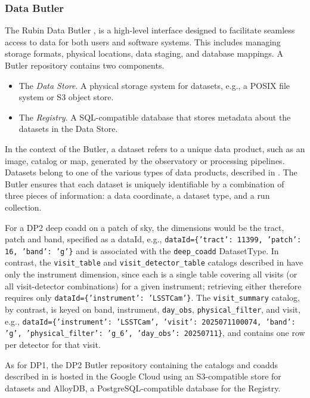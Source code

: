 \subsubsection{Data Butler}
\label{sssec:data_butler}
%
The Rubin Data Butler \citep[][]{2022SPIE12189E..11J, 2023arXiv230303313L},  is a high-level interface designed to facilitate seamless access to data for both users and software systems.
This includes managing storage formats, physical locations, data staging, and database mappings.
A \gls{Butler} repository contains two components.
\begin{itemize}
    \item The \emph{Data Store}.
A physical storage system for datasets, e.g., a \gls{POSIX} file system or \gls{S3} object store.
    \item The \emph{Registry}.
A \gls{SQL}-compatible database that stores \gls{metadata} about the datasets in the Data Store.
\end{itemize}

In the context of the \gls{Butler}, a dataset refers to a unique data product, such as an image, catalog or map, generated by the observatory or processing pipelines.
Datasets belong to one of the various types of data products, described in .
The \gls{Butler} ensures that each dataset is uniquely identifiable by a combination of three pieces of information: a data coordinate, a dataset type, and a run collection.

For a \gls{DP2} deep coadd on a \gls{patch} of sky, the dimensions would be the \gls{tract}, \gls{patch} and band, specified as a dataId, e.g., \texttt{dataId=\{'tract': 11399, 'patch': 16, 'band': 'g'\}} and is associated with the \texttt{deep\_coadd} DatasetType.
In contrast, the \texttt{visit\_table} and \texttt{visit\_detector\_table} catalogs described in  have only the instrument dimension, since each is a single table covering all visits (or all visit-detector combinations) for a given instrument; retrieving either therefore requires only \texttt{dataId=\{'instrument': 'LSSTCam'\}}.
The \texttt{visit\_summary} catalog, by contrast, is keyed on band, instrument, \texttt{day\_obs}, \texttt{physical\_filter}, and visit, e.g., \texttt{dataId=\{'instrument': 'LSSTCam', 'visit': 2025071100074, 'band': 'g', 'physical\_filter': 'g\_6', 'day\_obs': 20250711\}}, and contains one row per detector for that visit.

As for \gls{DP1}, the \gls{DP2} \gls{Butler} repository containing the catalogs and coadds described in  is hosted in the Google Cloud using an \gls{S3}-compatible store for datasets and AlloyDB, a PostgreSQL-compatible database for the Registry.

